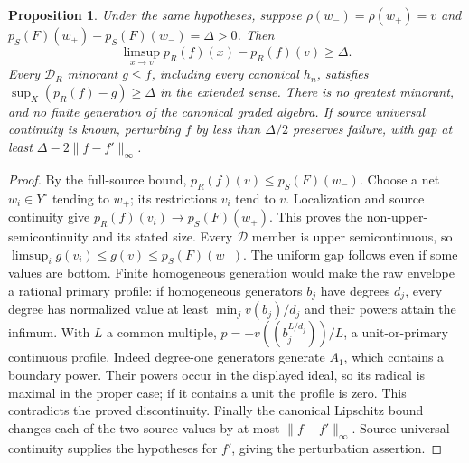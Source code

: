 \documentclass[11pt]{article}
\newtheorem{proposition}[theorem]{Proposition}
\newcommand{\D}{\mathcal D}
\begin{document}
\begin{proposition}\label{gap}
Under the same hypotheses, suppose $\rho(w_-)=\rho(w_+)=v$ and
$p_S(F)(w_+)-p_S(F)(w_-)=\Delta>0$. Then
\[
 \limsup_{x\to v}p_R(f)(x)-p_R(f)(v)\ge\Delta.
\]
Every $\D_R$ minorant $g\le f$, including every canonical $h_n$, satisfies
$\sup_X(p_R(f)-g)\ge\Delta$ in the extended sense.
There is no greatest minorant, and no finite generation of the canonical
graded algebra. If source universal continuity is known, perturbing $f$
by less than $\Delta/2$ preserves failure, with gap at least
$\Delta-2\|f-f'\|_\infty$.
\end{proposition}
\begin{proof}
By the full-source bound,
$p_R(f)(v)\le p_S(F)(w_-)$. Choose a net $w_i\in Y^\circ$ tending to
$w_+$; its restrictions $v_i$ tend to $v$. Localization and source
continuity give $p_R(f)(v_i)\to p_S(F)(w_+)$.
This proves the non-upper-semicontinuity and its stated size.
Every $\D$ member is upper semicontinuous, so
$\limsup_i g(v_i)\le g(v)\le p_S(F)(w_-)$.
The uniform gap follows even if some values are bottom.
Finite homogeneous generation would make the raw envelope a rational
primary profile: if homogeneous generators $b_j$ have degrees $d_j$,
every degree has normalized value at least $\min_j v(b_j)/d_j$ and their
powers attain the infimum. With $L$ a common multiple,
$p=-v((b_j^{L/d_j}))/L$, a unit-or-primary continuous profile.
Indeed degree-one generators generate $A_1$, which contains a boundary
power. Their powers occur in the displayed ideal, so its radical is
maximal in the proper case; if it contains a unit the profile is zero.
This contradicts the proved discontinuity.
Finally the canonical Lipschitz bound changes each of the two source
values by at most $\|f-f'\|_\infty$. Source universal continuity supplies
the hypotheses for $f'$, giving the perturbation assertion.
\end{proof}
\end{document}
